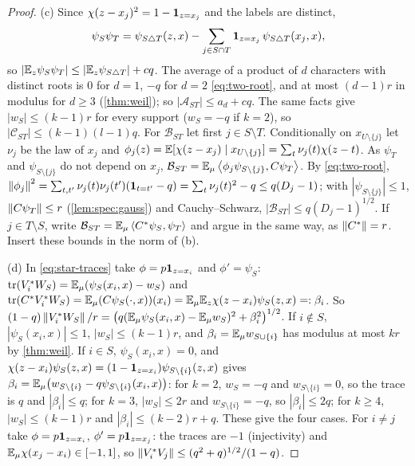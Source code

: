 \begin{proof}
(c) Since $\chi(z-x_j)^2=1-\mathbf 1_{z=x_j}$ and the labels are distinct,
\[
  \psi_S\psi_T=\psi_{S\triangle T}(z,x)-\sum_{j\in S\cap T}\mathbf 1_{z=x_j}\,\psi_{S\triangle T}(x_j,x),
\]
so $|\mathbb E_z\psi_S\psi_T|\le|\mathbb E_z\psi_{S\triangle T}|+cq$. The average of a product of $d$
characters with distinct roots is $0$ for $d=1$, $-q$ for $d=2$ \eqref{eq:two-root},
and at most $(d-1)r$ in modulus for $d\ge3$ (\cref{thm:weil}); so
$|\mathcal A_{ST}|\le a_d+cq$. The same facts give $|w_S|\le(k-1)r$ for every support
($w_S=-q$ if $k=2$), so $|\mathcal C_{ST}|\le(k-1)(l-1)q$. For $\mathcal B_{ST}$ let first
$j\in S\setminus T$. Conditionally on $x_{U\setminus\{j\}}$ let $\nu_j$ be the law of $x_j$ and
$\phi_j(z)=\mathbb E[\chi(z-x_j)\mid x_{U\setminus\{j\}}]=\sum_t\nu_j(t)\chi(z-t)$. As $\psi_T$ and
$\psi_{S\setminus\{j\}}$ do not depend on $x_j$,
$\mathcal B_{ST}=\mathbb E_\mu\left\langle \phi_j\psi_{S\setminus\{j\}},C\psi_T\right\rangle$. By \eqref{eq:two-root},
$\left\|\phi_j\right\|^2=\sum_{t,t'}\nu_j(t)\nu_j(t')(\mathbf 1_{t=t'}-q)=\sum_t\nu_j(t)^2-q\le q(D_j-1)$; with
$|\psi_{S\setminus\{j\}}|\le1$, $\left\|C\psi_T\right\|\le r$ (\cref{lem:spec:gauss}) and Cauchy--Schwarz,
$|\mathcal B_{ST}|\le q(D_j-1)^{1/2}$. If $j\in T\setminus S$, write
$\mathcal B_{ST}=\mathbb E_\mu\left\langle C^*\psi_S,\psi_T\right\rangle$ and argue in the same way, as $\left\|C^*\right\|=r$.
Insert these bounds in the norm of (b).

(d) In \eqref{eq:star-traces} take $\phi=p\mathbf 1_{z=x_i}$ and $\phi'=\psi_S$:
$\operatorname{tr}(V_i^*W_S)=\mathbb E_\mu(\psi_S(x_i,x)-w_S)$ and
$\operatorname{tr}(C^*V_i^*W_S)=\mathbb E_\mu(C\psi_S(\cdot,x))(x_i)=\mathbb E_\mu\mathbb E_z\chi(z-x_i)\psi_S(z,x)=:\beta_i$. So
$(1-q)\left\|V_i^*W_S\right\|/r=\big(q(\mathbb E_\mu\psi_S(x_i,x)-\mathbb E_\mu w_S)^2+\beta_i^2\big)^{1/2}$. If $i\notin S$,
$|\psi_S(x_i,x)|\le1$, $|w_S|\le(k-1)r$, and $\beta_i=\mathbb E_\mu w_{S\cup\{i\}}$ has modulus at most
$kr$ by \cref{thm:weil}. If $i\in S$, $\psi_S(x_i,x)=0$, and
$\chi(z-x_i)\psi_S(z,x)=(1-\mathbf 1_{z=x_i})\psi_{S\setminus\{i\}}(z,x)$ gives
$\beta_i=\mathbb E_\mu\big(w_{S\setminus\{i\}}-q\psi_{S\setminus\{i\}}(x_i,x)\big)$: for $k=2$, $w_S=-q$ and
$w_{S\setminus\{i\}}=0$, so the trace is $q$ and $|\beta_i|\le q$; for $k=3$, $|w_S|\le2r$ and
$w_{S\setminus\{i\}}=-q$, so $|\beta_i|\le2q$; for $k\ge4$, $|w_S|\le(k-1)r$ and
$|\beta_i|\le(k-2)r+q$. These give the four cases. For $i\ne j$ take
$\phi=p\mathbf 1_{z=x_i}$, $\phi'=p\mathbf 1_{z=x_j}$: the traces are $-1$ (injectivity) and
$\mathbb E_\mu\chi(x_j-x_i)\in[-1,1]$, so $\left\|V_i^*V_j\right\|\le(q^2+q)^{1/2}/(1-q)$.


\end{proof}
